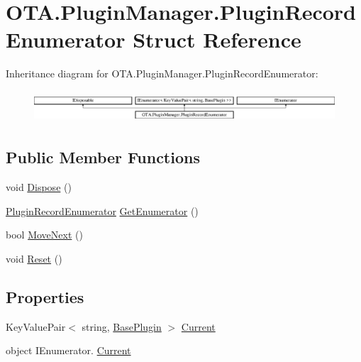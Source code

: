 \hypertarget{struct_o_t_a_1_1_plugin_manager_1_1_plugin_record_enumerator}{}\section{O\+T\+A.\+Plugin\+Manager.\+Plugin\+Record\+Enumerator Struct Reference}
\label{struct_o_t_a_1_1_plugin_manager_1_1_plugin_record_enumerator}
Inheritance diagram for O\+T\+A.\+Plugin\+Manager.\+Plugin\+Record\+Enumerator\+:\begin{figure}[H]
\begin{center}
\leavevmode
\includegraphics[height=1.196581cm]{struct_o_t_a_1_1_plugin_manager_1_1_plugin_record_enumerator}
\end{center}
\end{figure}
\subsection*{Public Member Functions}
\begin{DoxyCompactItemize}
\item 
void \hyperlink{struct_o_t_a_1_1_plugin_manager_1_1_plugin_record_enumerator_a8c2fc6d4dea9bd97774e18a916679f15}{Dispose} ()
\item 
\hyperlink{struct_o_t_a_1_1_plugin_manager_1_1_plugin_record_enumerator}{Plugin\+Record\+Enumerator} \hyperlink{struct_o_t_a_1_1_plugin_manager_1_1_plugin_record_enumerator_a1168d15e26b21edf7f6849b985bc173d}{Get\+Enumerator} ()
\item 
bool \hyperlink{struct_o_t_a_1_1_plugin_manager_1_1_plugin_record_enumerator_a93db0f29332c46985f7ee08c395778c5}{Move\+Next} ()
\item 
void \hyperlink{struct_o_t_a_1_1_plugin_manager_1_1_plugin_record_enumerator_a1c75c7fd16d7d1c4d1db7534e480cf72}{Reset} ()
\end{DoxyCompactItemize}
\subsection*{Properties}
\begin{DoxyCompactItemize}
\item 
Key\+Value\+Pair$<$ string, \hyperlink{class_o_t_a_1_1_plugin_1_1_base_plugin}{Base\+Plugin} $>$ \hyperlink{struct_o_t_a_1_1_plugin_manager_1_1_plugin_record_enumerator_ac1b20f5e1da4306b79f4cb5e78b5d30a}{Current}
\item 
object I\+Enumerator. \hyperlink{struct_o_t_a_1_1_plugin_manager_1_1_plugin_record_enumerator_a830eb690217632c0130a521b53b27fd0}{Current}
\end{DoxyCompactItemize}


